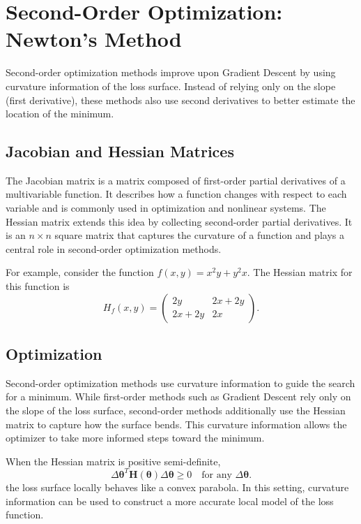 \documentclass{article}
\newcommand{\vecb}[1]{\boldsymbol{#1}} %
\newcommand{\matb}[1]{\mathbf{#1}}     %
\begin{document}
\section{Second-Order Optimization: Newton's Method}

Second-order optimization methods improve upon Gradient Descent by using curvature information of the loss surface. Instead of relying only on the slope (first derivative), these methods also use second derivatives to better estimate the location of the minimum.

\subsection{Jacobian and Hessian Matrices}

The Jacobian matrix is a matrix composed of first-order partial derivatives of a multivariable function. It describes how a function changes with respect to each variable and is commonly used in optimization and nonlinear systems. The Hessian matrix extends this idea by collecting second-order partial derivatives. It is an \( n \times n \) square matrix that captures the curvature of a function and plays a central role in second-order optimization methods.

For example, consider the function \( f(x,y) = x^2y + y^2x \). The Hessian matrix for this function is
\[
H_f(x,y)=
\begin{pmatrix}
2y & 2x+2y\\
2x+2y & 2x
\end{pmatrix}.
\]

\subsection{Optimization}

Second-order optimization methods use curvature information to guide the search for a minimum. While first-order methods such as Gradient Descent rely only on the slope of the loss surface, second-order methods additionally use the Hessian matrix to capture how the surface bends. This curvature information allows the optimizer to take more informed steps toward the minimum.

When the Hessian matrix is positive semi-definite,
\[
\Delta\vecb{\theta}^T \matb{H}(\vecb{\theta})\Delta\vecb{\theta} \ge 0
\quad \text{for any } \Delta\vecb{\theta}.
\]
the loss surface locally behaves like a convex parabola. In this setting, curvature information can be used to construct a more accurate local model of the loss function.
\end{document}
